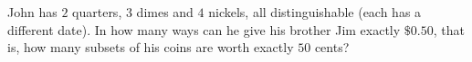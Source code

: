 John has $2$ quarters, $3$ dimes and $4$ nickels, all distinguishable (each has a different date). In how many ways can he give his brother Jim exactly $\$0.50$, that is, how many subsets of his coins are worth exactly $50$ cents?
